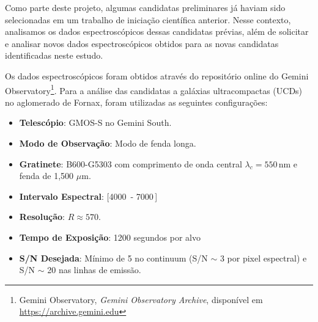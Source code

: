 Como parte deste projeto, algumas candidatas preliminares já haviam sido selecionadas em um trabalho de iniciação científica anterior. Nesse contexto, analisamos os dados espectroscópicos dessas candidatas prévias, além de solicitar e analisar novos dados espectroscópicos obtidos para as novas candidatas identificadas neste estudo.

Os dados espectroscópicos foram obtidos através do repositório online do Gemini Observatory\footnote{Gemini Observatory, \textit{Gemini Observatory Archive}, disponível em \url{https://archive.gemini.edu}}. Para a análise das candidatas a galáxias ultracompactas (UCDs) no aglomerado de Fornax, foram utilizadas as seguintes configurações:

\begin{itemize}
    \item \textbf{Telescópio}: GMOS-S no Gemini South.
    \item \textbf{Modo de Observação}: Modo de fenda longa.
    \item \textbf{Gratinete}: B600-G5303 com comprimento de onda central $\lambda_c = 550 \, \text{nm}$ e fenda de 1,500 $\mu\text{m}$.
    \item \textbf{Intervalo Espectral}: [4000\, - 7000\,]
    \item \textbf{Resolução}: $R \approx 570$.
    \item \textbf{Tempo de Exposição}: 1200 segundos por alvo
    \item \textbf{S/N Desejada}: Mínimo de 5 no continuum (S/N $\sim$ 3 por pixel espectral) e S/N $\sim$ 20 nas linhas de emissão.
\end{itemize}
